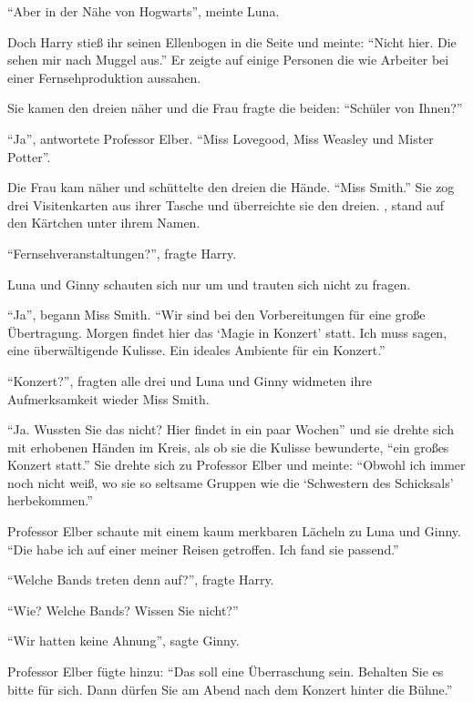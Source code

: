 \enquote{Aber in der Nähe von Hogwarts\abs}, meinte Luna.

Doch Harry stieß ihr seinen Ellenbogen in die Seite und meinte: \enquote{Nicht hier. Die sehen mir nach Muggel aus.} Er zeigte auf einige Personen die wie Arbeiter bei einer Fernsehproduktion aussahen.

Sie kamen den dreien näher und die Frau fragte die beiden: \enquote{Schüler von Ihnen?}

\enquote{Ja}, antwortete Professor Elber. \enquote{Miss Lovegood, Miss Weasley und Mister Potter}.

Die Frau kam näher und schüttelte den dreien die Hände. \enquote{Miss Smith.} Sie zog drei Visitenkarten aus ihrer Tasche und überreichte sie den dreien. , stand auf den Kärtchen unter ihrem Namen.

\enquote{Fernsehveranstaltungen?}, fragte Harry.

Luna und Ginny schauten sich nur um und trauten sich nicht zu fragen.

\enquote{Ja}, begann Miss Smith. \enquote{Wir sind bei den Vorbereitungen für eine große Übertragung. Morgen findet hier das \enquote{Magie in Konzert} statt. Ich muss sagen, eine überwältigende Kulisse. Ein ideales Ambiente für ein Konzert.}

\enquote{Konzert?}, fragten alle drei und Luna und Ginny widmeten ihre Aufmerksamkeit wieder Miss Smith.

\enquote{Ja. Wussten Sie das nicht? Hier findet in ein paar Wochen\abs} und sie drehte sich mit erhobenen Händen im Kreis, als ob sie die Kulisse bewunderte, \enquote{ein großes Konzert statt.} Sie drehte sich zu Professor Elber und meinte: \enquote{Obwohl ich immer noch nicht weiß, wo sie so seltsame Gruppen wie die \enquote{Schwestern des Schicksals} herbekommen.}

Professor Elber schaute mit einem kaum merkbaren Lächeln zu Luna und Ginny. \enquote{Die habe ich auf einer meiner Reisen getroffen. Ich fand sie passend.}

\enquote{Welche Bands treten denn auf?}, fragte Harry.

\enquote{Wie? Welche Bands? Wissen Sie nicht\abs?}

\enquote{Wir hatten keine Ahnung}, sagte Ginny.

Professor Elber fügte hinzu: \enquote{Das soll eine Überraschung sein. Behalten Sie es bitte für sich. Dann dürfen Sie am Abend nach dem Konzert hinter die Bühne.}

